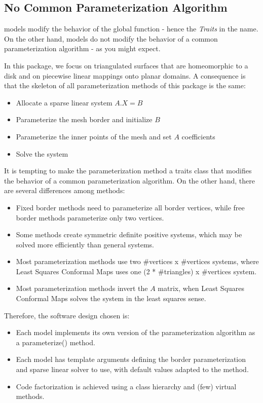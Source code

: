 \subsection{No Common Parameterization Algorithm}

 models modify the behavior of the global function
 - hence the {\em Traits} in the name.
On the other hand,  models do not modify the behavior
of a common parameterization algorithm - as you might expect.

In this package, we focus on triangulated surfaces that are homeomorphic to a
disk and on piecewise linear mappings onto planar domains.
A consequence is that the skeleton of all parameterization methods of this
package is the same:
\begin{itemize}
\item Allocate a sparse linear system $A.X = B$
\item Parameterize the mesh border and initialize $B$
\item Parameterize the inner points of the mesh and set $A$ coefficients
\item Solve the system
\end{itemize}

It is tempting to make the parameterization method a traits class that
modifies the behavior of a common parameterization algorithm.
On the other hand, there are several differences among methods:
\begin{itemize}
\item Fixed border methods need to parameterize all border vertices,
      while free border methods parameterize only two vertices.
\item Some methods create symmetric definite positive systems,
      which may be solved more efficiently than general systems.
\item Most parameterization methods use two \#vertices x \#vertices systems,
      where Least Squares Conformal Maps uses one (2 * \#triangles) x \#vertices system.
\item Most parameterization methods invert the $A$ matrix,
      when Least Squares Conformal Maps solves the system in the least squares sense.
\end{itemize}

Therefore, the software design chosen is:
\begin{itemize}
\item Each  model implements its own version
      of the parameterization algorithm as a parameterize() method.
\item Each  model has template arguments
      defining the border parameterization and sparse linear solver to use,
      with default values adapted to the method.
\item Code factorization is achieved using a class hierarchy and (few) virtual methods.
\end{itemize}

